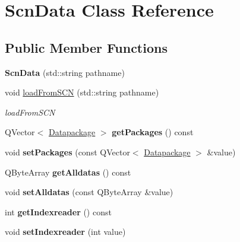 \hypertarget{classScnData}{\section{Scn\-Data Class Reference}
\label{classScnData}
}
\subsection*{Public Member Functions}
\begin{DoxyCompactItemize}
\item 
\hypertarget{classScnData_a56a78467b0952f1059a39a882465fd6d}{{\bfseries Scn\-Data} (std\-::string pathname)}\label{classScnData_a56a78467b0952f1059a39a882465fd6d}

\item 
void \hyperlink{classScnData_ad38f540cf59168597be7e9ecf32a4901}{load\-From\-S\-C\-N} (std\-::string pathname)
\begin{DoxyCompactList}\small\item\em load\-From\-S\-C\-N \end{DoxyCompactList}\item 
\hypertarget{classScnData_a4a8fe4672185846fb4f6e6ad6ac62eef}{Q\-Vector$<$ \hyperlink{classDatapackage}{Datapackage} $>$ {\bfseries get\-Packages} () const }\label{classScnData_a4a8fe4672185846fb4f6e6ad6ac62eef}

\item 
\hypertarget{classScnData_a8bbb0728d350e8fa6f55dc66f6de2d23}{void {\bfseries set\-Packages} (const Q\-Vector$<$ \hyperlink{classDatapackage}{Datapackage} $>$ \&value)}\label{classScnData_a8bbb0728d350e8fa6f55dc66f6de2d23}

\item 
\hypertarget{classScnData_aa3ec98a431ba09c271b63591a698527e}{Q\-Byte\-Array {\bfseries get\-Alldatas} () const }\label{classScnData_aa3ec98a431ba09c271b63591a698527e}

\item 
\hypertarget{classScnData_a071d7a5a8cb03dc7ef796a1b24eb1d6a}{void {\bfseries set\-Alldatas} (const Q\-Byte\-Array \&value)}\label{classScnData_a071d7a5a8cb03dc7ef796a1b24eb1d6a}

\item 
\hypertarget{classScnData_ac89256a37f64c12026b872a0e3837f70}{int {\bfseries get\-Indexreader} () const }\label{classScnData_ac89256a37f64c12026b872a0e3837f70}

\item 
\hypertarget{classScnData_a6af731fe1cbda4d1d49db4b2fad27073}{void {\bfseries set\-Indexreader} (int value)}\label{classScnData_a6af731fe1cbda4d1d49db4b2fad27073}

\end{DoxyCompactItemize}


